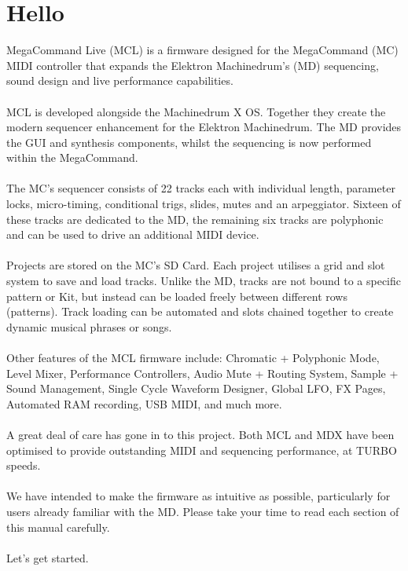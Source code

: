 \section{Hello}
MegaCommand Live (MCL) is a firmware designed for the MegaCommand (MC) MIDI controller that expands the Elektron Machinedrum's (MD) sequencing, sound design and live performance capabilities. 
\\
\\
MCL is developed alongside the Machinedrum X OS. Together they create the modern sequencer enhancement for the Elektron Machinedrum. The MD provides the GUI and synthesis components, whilst the sequencing is now performed within the MegaCommand.
\\
\\
The MC's sequencer consists of 22 tracks each with individual length, parameter locks, micro-timing, conditional trigs, slides, mutes and an arpeggiator. Sixteen of these tracks are dedicated to the MD, the remaining six tracks are polyphonic and can be used to drive an additional MIDI device.
\\
\\
Projects are stored on the MC's SD Card. Each project utilises a grid and slot system to save and load tracks. Unlike the MD, tracks are not bound to a specific pattern or Kit, but instead can be loaded freely between different rows (patterns). Track loading can be automated and slots chained together to create dynamic musical phrases or songs. 
\\
\\
Other features of the MCL firmware include: Chromatic + Polyphonic Mode,  Level Mixer, Performance Controllers, Audio Mute + Routing System,  Sample + Sound Management, Single Cycle Waveform Designer, Global LFO, FX Pages, Automated RAM recording, USB MIDI, and much more.
\\
\\
A great deal of care has gone in to this project. Both MCL and MDX have been optimised to provide outstanding MIDI and sequencing performance, at TURBO speeds.
\\
\\
We have intended to make the firmware as intuitive as possible, particularly for users already familiar with the MD. Please take your time to read each section of this manual carefully. 
\\
\\
Let's get started.